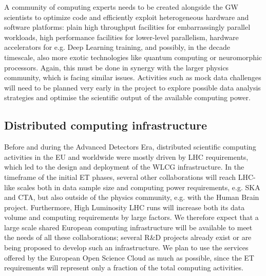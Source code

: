 A community of computing experts needs to be created alongside the GW scientists to optimize code and efficiently exploit heterogeneous hardware and software platforms: plain high throughput facilities for embarrassingly parallel workloads, high performance facilities for lower-level parallelism, hardware accelerators for e.g. Deep Learning training, and possibly, in the decade timescale, also more exotic technologies like quantum computing or neuromorphic processors. Again, this must be done in synergy with the larger physics community, which is facing similar issues.
Activities such as mock data challenges will need to be planned very early in the project to explore possible data analysis strategies and optimise the scientific output of the available computing power. 

\subsection[Distributed computing infrastructure]{Distributed computing infrastructure}
\label{sec:Distributed computing infrastructure}
Before and during the Advanced Detectors Era, distributed scientific computing activities in the EU and worldwide were mostly driven by LHC requirements, which led to the design and deployment of the WLCG infrastructure.
In the timeframe of the initial ET phases, several other collaborations will reach LHC-like scales both in data sample size and computing power requirements, e.g. SKA and CTA, but also outside of the physics community, e.g. with the Human Brain project. Furthermore, High Luminosity LHC runs will increase both its data volume and computing requirements by large factors.
We therefore expect that a large scale shared European computing infrastructure will be available to meet the needs of all these collaborations; several R\&D projects already exist or are being proposed to develop %
such an infrastructure. We plan to use the services offered by the European Open Science Cloud as much as possible, since the ET requirements will represent only a fraction of the total computing activities.

